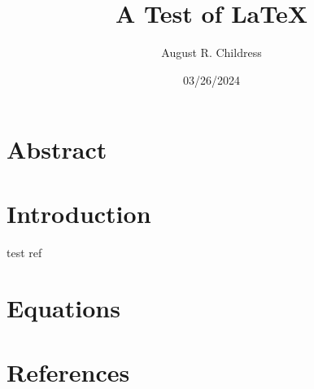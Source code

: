\documentclass{article}
\author{August R. Childress}
\title{A Test of LaTeX}
\date{03/26/2024}
\begin{document}
\maketitle

\section{Abstract}


\section{Introduction}
test ref \cite{mitchell_locating_2023}


\section{Equations}




\section{References}


\end{document}

